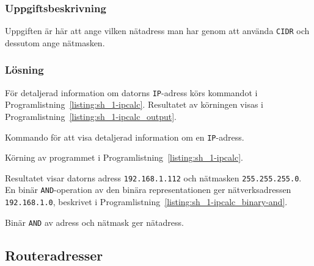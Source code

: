 \subsubsection{Uppgiftsbeskrivning}
Uppgiften är här att ange vilken nätadress man har genom att använda
\texttt{CIDR} och dessutom ange nätmasken.


\subsubsection{Lösning}
För detaljerad information om datorns \texttt{IP}-adress körs kommandot i
Programlistning~\ref{listing:sh_1-ipcalc}. Resultatet av körningen visas i
Programlistning~\ref{listing:sh_1-ipcalc_output}.

\begin{listing}[H]
  \caption{Kommando för att visa detaljerad information om en
           \texttt{IP}-adress.}
  \label{listing:sh_1-ipcalc}
\end{listing}

\begin{listing}[H]
  \caption{Körning av programmet i Programlistning~\ref{listing:sh_1-ipcalc}.}
  \label{listing:sh_1-ipcalc_output}
\end{listing}


Resultatet visar datorns adress \texttt{192.168.1.112} och nätmasken
\texttt{255.255.255.0}.  En binär \texttt{AND}-operation av den binära
representationen ger nätverksadressen \texttt{192.168.1.0}, beskrivet i
Programlistning~\ref{listing:sh_1-ipcalc_binary-and}.

\begin{listing}[H]
  \caption{Binär \texttt{AND} av adress och nätmask ger nätadress.}
  \label{listing:sh_1-ipcalc_binary-and}
\end{listing}






\subsection{Routeradresser}
